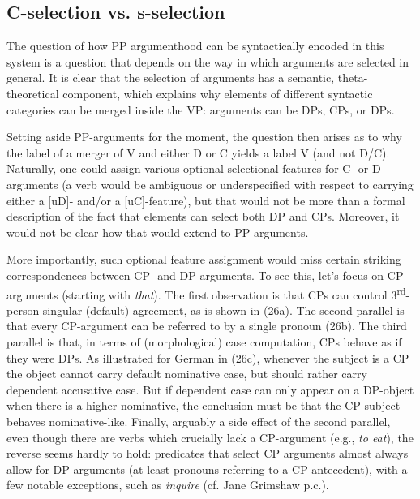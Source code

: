 \documentclass[output=paper
,modfonts
,nonflat]{langsci/langscibook}
\begin{document}
\subsection{C-selection vs. s-selection}
The question of how PP argumenthood can be syntactically encoded in this system is a question that depends on the way in which arguments are selected in general. It is clear that the selection of arguments has a semantic, theta-theoretical component, which explains why elements of different syntactic categories can be merged inside the VP: arguments can be DPs, CPs, or DPs.

Setting aside PP-arguments for the moment, the question then arises as to why the label of a merger of V and either D or C yields a label V (and not D/C). Naturally, one could assign various optional selectional features for C- or D-arguments (a verb would be ambiguous or underspecified with respect to carrying either a [uD]- and/or a [uC]-feature), but that would not be more than a formal description of the fact that elements can select both DP and CPs. Moreover, it would not be clear how that would extend to PP-arguments.

More importantly, such optional feature assignment would miss certain striking correspondences between CP- and DP-arguments. To see this, let’s focus on CP-arguments (starting with \textit{that}). The first observation is that CPs can control 3\textsuperscript{rd}-person-singular (default) agreement, as is shown in (26a). The second parallel is that every CP-argument can be referred to by a single pronoun (26b). The third parallel is that, in terms of (morphological) case computation, CPs behave as if they were DPs. As illustrated for German in (26c), whenever the subject is a CP the object cannot carry default nominative case, but should rather carry dependent accusative case. But if dependent case can only appear on a DP-object when there is a higher nominative, the conclusion must be that the CP-subject behaves nominative-like. Finally, arguably a side effect of the second parallel, even though there are verbs which crucially lack a CP-argument (e.g., \textit{to eat}), the reverse seems hardly to hold: predicates that select CP arguments almost always allow for DP-arguments (at least pronouns referring to a CP-antecedent), with a few notable exceptions, such as \textit{inquire} (cf. Jane Grimshaw p.c.).
\end{document}
